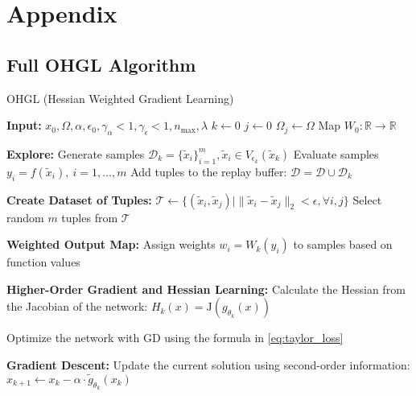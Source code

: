 \section{Appendix}


\subsection{Full OHGL Algorithm}
\begin{algorithm}
   \caption{OHGL (Hessian Weighted Gradient Learning)}
   \label{code:full OHGL}
\begin{algorithmic}
   \STATE \textbf{Input:} $x_0, \Omega, \alpha, \epsilon_0, \gamma_{\alpha} < 1, \gamma_{\epsilon} < 1, n_{\max}, \lambda$
   \STATE $k \gets 0$
   \STATE $j \gets 0$
   \STATE $\Omega_j \gets \Omega$
   \STATE Map $W_0: \mathbb{R} \to \mathbb{R}$

      \STATE \textbf{Explore:}
      \STATE \hspace{1em} Generate samples $\mathcal{D}_k = \{ \tilde{x}_i \}_{i=1}^m, \tilde{x}_i \in V_{\epsilon_k}(\tilde{x}_k)$
      \STATE \hspace{1em} Evaluate samples $y_i = f(\tilde{x}_i), \ i = 1, \dots, m$
      \STATE \hspace{1em} Add tuples to the replay buffer: $\mathcal{D} = \mathcal{D} \cup \mathcal{D}_k$
      
      \STATE \textbf{Create Dataset of Tuples:}
      \STATE \hspace{1em} $\mathcal{T} \gets \{ (\tilde{x}_i, \tilde{x}_j) \mid \|\tilde{x}_i - \tilde{x}_j\|_2 < \epsilon, \forall i, j \}$
      \STATE \hspace{1em} Select random $m$ tuples from $\mathcal{T}$

      \STATE \textbf{Weighted Output Map:}
      \STATE \hspace{1em} Assign weights $w_i = W_k(y_i)$ to samples based on function values
      
      \STATE \textbf{Higher-Order Gradient and Hessian Learning:}
      \STATE \hspace{1em} Calculate the Hessian from the Jacobian of the network: $H_k(x) = \text{J}(g_{\theta_k}(x))$

      \STATE \hspace{1em} Optimize the network with GD using the formula in \ref{eq:taylor_loss}
      
      \STATE \textbf{Gradient Descent:}
      \STATE \hspace{1em} Update the current solution using second-order information:
      \STATE \hspace{1em} $x_{k+1} \gets x_k - \alpha \cdot \tilde{g}_{\theta_k}(x_k)$
      

\end{algorithmic}
\end{algorithm}

